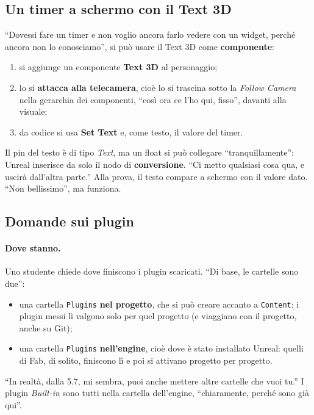 \subsection{Un timer a schermo con il Text 3D}

``Dovessi fare un timer e non voglio ancora farlo vedere con un widget, perché
ancora non lo conosciamo'', si può usare il Text 3D come \textbf{componente}:
\begin{enumerate}
  \item si aggiunge un componente \textbf{Text 3D} al personaggio;
  \item lo si \textbf{attacca alla telecamera}, cioè lo si trascina sotto la
        \emph{Follow Camera} nella gerarchia dei componenti, ``così ora ce l'ho
        qui, fisso'', davanti alla visuale;
  \item da codice si usa \textbf{Set Text} e, come testo, il valore del timer.
\end{enumerate}
Il pin del testo è di tipo \emph{Text}, ma un float si può collegare
``tranquillamente'': Unreal inserisce da solo il nodo di \textbf{conversione}.
``Ci metto qualsiasi cosa qua, e uscirà dall'altra parte.'' Alla prova, il
testo compare a schermo con il valore dato. ``Non bellissimo'', ma funziona.

\subsection{Domande sui plugin}

\paragraph{Dove stanno.} Uno studente chiede dove finiscono i plugin scaricati.
``Di base, le cartelle sono due'':
\begin{itemize}
  \item una cartella \texttt{Plugins} \textbf{nel progetto}, che si può creare
        accanto a \texttt{Content}: i plugin messi lì valgono solo per quel
        progetto (e viaggiano con il progetto, anche su Git);
  \item una cartella \texttt{Plugins} \textbf{nell'engine}, cioè dove è stato
        installato Unreal: quelli di Fab, di solito, finiscono lì e poi si
        attivano progetto per progetto.
\end{itemize}
``In realtà, dalla 5.7, mi sembra, puoi anche mettere altre cartelle che vuoi
tu.'' I plugin \emph{Built-in} sono tutti nella cartella dell'engine,
``chiaramente, perché sono già qui''.

